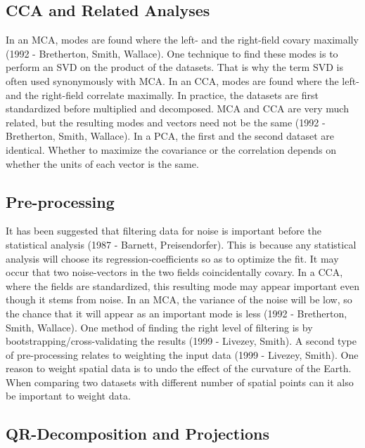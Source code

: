 \documentclass{acm_proc_article-sp}
\begin{document}
\subsection{CCA and Related Analyses}
\label{sec:Introduction CCA and Related Analyses}

In an MCA, modes are found where the left- and the right-field covary maximally (1992 - Bretherton, Smith, Wallace). One technique to find these modes is to perform an SVD on the product of the datasets. That is why the term SVD is often used synonymously with MCA.
In an CCA, modes are found where the left- and the right-field correlate maximally. In practice, the datasets are first standardized before multiplied and decomposed. MCA and CCA are very much related, but the resulting modes and vectors need not be the same (1992 - Bretherton, Smith, Wallace).
In a PCA, the first and the second dataset are identical. Whether to maximize the covariance or the correlation depends on whether the units of each vector is the same.

\subsection{Pre-processing}
\label{sec:Introductio Pre-processingn}

It has been suggested that filtering data for noise is important before the statistical analysis (1987 - Barnett, Preisendorfer). This is because any statistical analysis will choose its regression-coefficients so as to optimize the fit. It may occur that two noise-vectors in the two fields coincidentally covary. In a CCA, where the fields are standardized, this resulting mode may appear important even though it stems from noise. In an MCA, the variance of the noise will be low, so the chance that it will appear as an important mode is less (1992 - Bretherton, Smith, Wallace). One method of finding the right level of filtering is by bootstrapping/cross-validating the results (1999 - Livezey, Smith).
A second type of pre-processing relates to weighting the input data (1999 - Livezey, Smith). One reason to weight spatial data is to undo the effect of the curvature of the Earth. When comparing two datasets with different number of spatial points can it also be important to weight data.

\subsection{QR-Decomposition and Projections}
\label{sec:Introduction QR-Decomposition and Projections}
\end{document}
